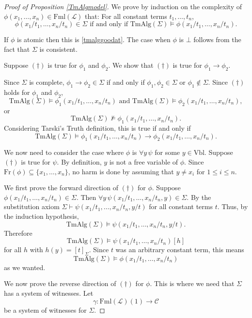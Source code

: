 \documentclass[11pt]{article}
\newcommand{\TmAlg}{\mathrm{TmAlg}}
\newcommand{\proves}{\vdash}
\newcommand{\Fml}{\textrm{Fml}}
\newcommand{\Fr}{\textrm{Fr}}
\newcommand{\Vbl}{\textrm{Vbl}}
\newcommand{\mcal}[1]{\mathcal{#1}}
\begin{document}
\begin{proof}[Proof of Proposition \ref{TmAlgmodel}]
We prove by induction on the complexity of $\phi(x_1,\ldots,x_n)\in\Fml(\mcal{L})$ that: For all constant terms $t_1,\ldots,t_n$,
\[\phi(x_1/t_1,\ldots,x_n/t_n)\in\Sigma \text{ if and only if } \TmAlg(\Sigma)\models \phi(x_1/t_1,\ldots,x_n/t_n). \tag{$\dagger$}\]

If $\phi$ is atomic then this is \ref{tmalggoodat}. The case when $\phi$ is $\bot$ follows from the fact that $\Sigma$ is consistent.

Suppose $(\dagger)$ is true for $\phi_1$ and $\phi_2$. We show that $(\dagger)$ is true for $\phi_1\rightarrow \phi_2$.

Since $\Sigma$ is complete, $\phi_1\rightarrow \phi_2\in\Sigma$ if and only if $\phi_1,\phi_2\in \Sigma$ or $\phi_1\notin\Sigma$. Since $(\dagger)$ holds for $\phi_1$ and $\phi_2$,
\[ \TmAlg(\Sigma)\models\phi_1(x_1/t_1,\ldots,x_n/t_n) \text{ and } \TmAlg(\Sigma)\models\phi_2(x_1/t_1,\ldots,x_n/t_n),\] or \[\TmAlg(\Sigma)\nvDash\phi_1(x_1/t_1,\ldots,x_n/t_n).\]
Considering Tarski's Truth definition, this is true if and only if
\[\TmAlg(\Sigma)\models\phi_1(x_1/t_1,\ldots,x_n/t_n)\rightarrow \phi_2(x_1/t_1,\ldots,x_n/t_n).\]


We now need to consider the case where $\phi$ is $\forall y \, \psi$ for some $y\in\Vbl$. Suppose $(\dagger)$ is true for $\psi$. By definition, $y$ is not a free variable of $\phi$. Since $\Fr(\phi)\subseteq \{x_1,\ldots,x_n\}$, no harm is done by assuming that $y\neq x_i$ for $1\leq i\leq n$.

We first prove the forward direction of $(\dagger)$ for $\phi$. Suppose $\phi(x_1/t_1,\ldots,x_n/t_n)\in\Sigma$. Then $\forall y\,\psi(x_1/t_1,\ldots,x_n/t_n,y)\in\Sigma$. By the substitution axiom $\Sigma\proves \psi(x_1/t_1,\ldots,x_n/t_n,y/t)$ for all constant terms $t$. Thus, by the induction hypothesis,
\[\TmAlg(\Sigma)\models \psi(x_1/t_1,\ldots,x_n/t_n,y/t).\] Therefore
\[\TmAlg(\Sigma)\models \psi(x_1/t_1,\ldots,x_n/t_n)[h]\] for all $h$ with $h(y)=[t]_\Sigma$. Since $t$ was an arbitrary constant term, this means
\[\TmAlg(\Sigma)\models\phi(x_1/t_1,\ldots,x_n/t_n)\] as we wanted.


We now prove the reverse direction of $(\dagger)$ for $\phi$. This is where we need that $\Sigma$ has a system of witnesses. Let
\[\gamma:\Fml(\mcal{L})(1)\rightarrow \mcal{C}\] be a system of witnesses for $\Sigma$.


\end{proof}
\end{document}

